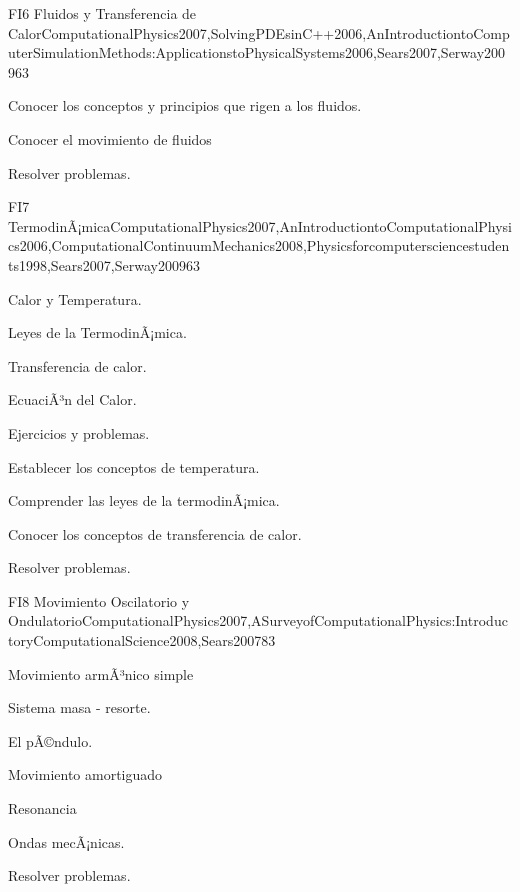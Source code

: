 \begin{syllabus}
\begin{unit}{FI6 Fluidos y Transferencia de Calor}{ComputationalPhysics2007,SolvingPDEsinC++2006,AnIntroductiontoComputerSimulationMethods:ApplicationstoPhysicalSystems2006,Sears2007,Serway2009}{6}{3}
   \begin{learningoutcomes}
      \item Conocer los conceptos y principios que rigen a los fluidos.
      \item Conocer el movimiento de fluidos 
      \item Resolver problemas.
   \end{learningoutcomes}
\end{unit}

\begin{unit}{FI7 TermodinÃ¡mica}{ComputationalPhysics2007,AnIntroductiontoComputationalPhysics2006,ComputationalContinuumMechanics2008,Physicsforcomputersciencestudents1998,Sears2007,Serway2009}{6}{3}
\begin{topics}
      \item Calor y Temperatura.
      \item Leyes de la TermodinÃ¡mica.
      \item Transferencia de calor.
      \item EcuaciÃ³n del Calor.
      \item Ejercicios y problemas.
  \end{topics}

   \begin{learningoutcomes}
      \item Establecer los conceptos de temperatura.
      \item Comprender las leyes de la termodinÃ¡mica.
      \item Conocer los conceptos de transferencia de calor.
      \item Resolver problemas.
   \end{learningoutcomes}
\end{unit}

\begin{unit}{FI8 Movimiento Oscilatorio y Ondulatorio}{ComputationalPhysics2007,ASurveyofComputationalPhysics:IntroductoryComputationalScience2008,Sears2007}{8}{3}
\begin{topics}
      \item Movimiento armÃ³nico simple
      \item Sistema masa - resorte.
      \item El pÃ©ndulo.
      \item Movimiento amortiguado
      \item Resonancia
      \item Ondas mecÃ¡nicas.
      \item Resolver problemas.
  \end{topics}


\end{unit}
\end{syllabus}
